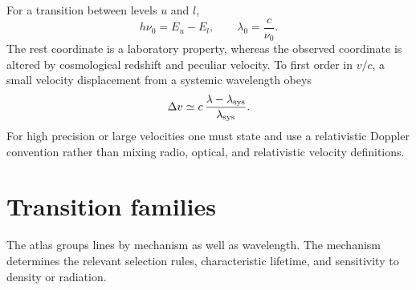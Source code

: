 For a transition between levels $u$ and $l$,
\begin{equation}
  h\nu_0 = E_u-E_l, \qquad \lambda_0 = \frac{c}{\nu_0}.
  \label{eq:foundation-transition}
\end{equation}
The rest coordinate is a laboratory property, whereas the observed coordinate is
altered by cosmological redshift and peculiar velocity.  To first order in
$v/c$, a small velocity displacement from a systemic wavelength obeys
\begin{equation}
  \Delta v \simeq c\,\frac{\lambda-\lambda_{\rm sys}}
                              {\lambda_{\rm sys}}.
\end{equation}
For high precision or large velocities one must state and use a relativistic
Doppler convention rather than mixing radio, optical, and relativistic velocity
definitions.



\section{Transition families}

The atlas groups lines by mechanism as well as wavelength.  The mechanism
determines the relevant selection rules, characteristic lifetime, and sensitivity
to density or radiation.

